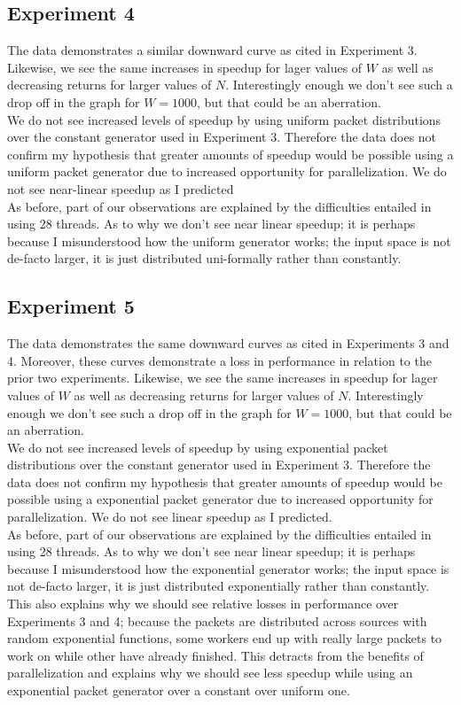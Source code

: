 \documentclass[]{article}
\begin{document}
\subsection{Experiment 4}
The data demonstrates a similar downward curve as cited in Experiment 3. Likewise, we see the same increases in speedup for lager values of $W$ as well as decreasing returns for larger values of $N$. Interestingly enough we don't see such a drop off in the graph for $W = 1000$, but that could be an aberration.
\\
We do not see increased levels of speedup by using uniform packet distributions over the constant generator used in Experiment 3. Therefore the data does not confirm my hypothesis that greater amounts of speedup would be possible using a uniform packet generator due to increased opportunity for parallelization. We do not see near-linear speedup as I predicted
\\ 
As before, part of our observations are explained by the difficulties entailed in using 28 threads. As to why we don't see near linear speedup; it is perhaps because I misunderstood how the uniform generator works; the input space is not de-facto larger, it is just distributed uni-formally rather than constantly.


\subsection{Experiment 5}
The data demonstrates the same downward curves as cited in Experiments 3 and 4. Moreover, these curves demonstrate a loss in performance in relation to the prior two experiments. Likewise, we see the same increases in speedup for lager values of $W$ as well as decreasing returns for larger values of $N$. Interestingly enough we don't see such a drop off in the graph for $W = 1000$, but that could be an aberration.
\\
We do not see increased levels of speedup by using exponential packet distributions over the constant generator used in Experiment 3. Therefore the data does not confirm my hypothesis that greater amounts of speedup would be possible using a exponential packet generator due to increased opportunity for parallelization. We do not see linear speedup as I predicted.
\\ 
As before, part of our observations are explained by the difficulties entailed in using 28 threads. As to why we don't see near linear speedup; it is perhaps because I misunderstood how the exponential generator works; the input space is not de-facto larger, it is just distributed exponentially rather than constantly. This also explains why we should see relative losses in performance over Experiments 3 and 4; because the packets are distributed across sources with random exponential functions, some workers end up with really large packets to work on while other have already finished. This detracts from the benefits of parallelization and explains why we should see less speedup while using an exponential packet generator over a constant over uniform one.
\end{document}
